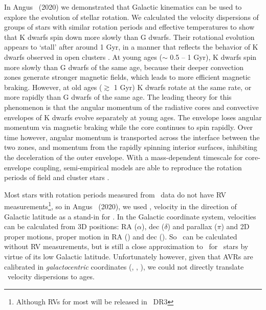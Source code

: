 In Angus \etal\ (2020) we demonstrated that Galactic kinematics can be used to
explore the evolution of stellar rotation.
We calculated the velocity dispersions of groups of stars with similar
rotation periods and effective temperatures to show that K dwarfs spin down
more slowly than G dwarfs.
Their rotational evolution appears to `stall' after around 1 Gyr, in a manner
that reflects the behavior of K dwarfs observed in open clusters
\citep{curtis2019}.
At young ages ($\sim$ 0.5 -- 1 Gyr), K dwarfs spin more slowly than G dwarfs of
the same age, because their deeper convection zones generate stronger magnetic
fields, which leads to more efficient magnetic braking.
However, at old ages ($\gtrsim$ 1 Gyr) K dwarfs rotate at the same rate, or
more rapidly than G dwarfs of the same age.
The leading theory for this phenomenon is that the angular momentum of the
radiative cores and convective envelopes of K dwarfs evolve separately at
young ages.
The envelope loses angular momentum via magnetic braking while the core
continues to spin rapidly.
Over time however, angular momentum is transported across the interface
between the two zones, and momentum from the rapidly spinning interior
surfaces, inhibiting the deceleration of the outer envelope.
With a mass-dependent timescale for core-envelope coupling, semi-empirical
models are able to reproduce the rotation periods of field and cluster stars
\citep[][Angus \etal, 2020]{spada2019, curtis2019}.

Most stars with rotation periods measured from \kepler\ data do not have RV
measurements\footnote{Although RVs for most will be released in \gaia\ DR3},
so in Angus \etal\ (2020), we used \vb, velocity in the direction of Galactic
latitude as a stand-in for \vz.
In the Galactic coordinate system, velocities can be calculated from 3D
positions: RA ($\alpha$), dec ($\delta$) and parallax ($\pi$) and 2D proper
motions, proper motion in RA (\mura) and dec (\mudec).
So \vb\ can be calculated without RV measurements, but is still a close
approximation to \vz\ for \kepler\ stars by virtue of its low Galactic
latitude.
Unfortunately however, given that AVRs are calibrated in {\it galactocentric}
coordinates (\vx, \vy, \vz), we could not directly translate \vb\ velocity
dispersions to ages.

